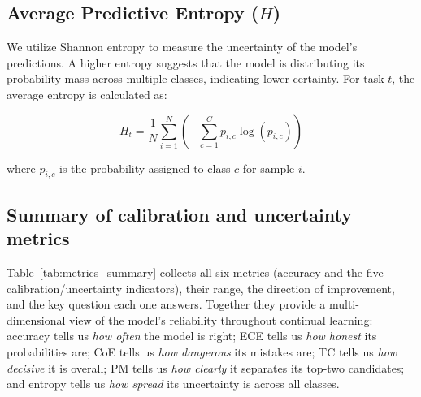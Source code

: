 \subsection{Average Predictive Entropy ($H$)}
We utilize Shannon entropy to measure the uncertainty of the model's predictions. A higher entropy suggests that the model is distributing its probability mass across multiple classes, indicating lower certainty. For task $t$, the average entropy is calculated as:

\begin{equation}
	H_t = \frac{1}{N} \sum_{i=1}^{N} \left( - \sum_{c=1}^{C} p_{i,c} \log(p_{i,c}) \right)
\end{equation}

where $p_{i,c}$ is the probability assigned to class $c$ for sample $i$.

\subsection*{Summary of calibration and uncertainty metrics}

Table~\ref{tab:metrics_summary} collects all six metrics (accuracy and the five calibration/uncertainty indicators), their range, the direction of improvement, and the key question each one answers. Together they provide a multi-dimensional view of the model's reliability throughout continual learning: accuracy tells us \emph{how often} the model is right; ECE tells us \emph{how honest} its probabilities are; CoE tells us \emph{how dangerous} its mistakes are; TC tells us \emph{how decisive} it is overall; PM tells us \emph{how clearly} it separates its top-two candidates; and entropy tells us \emph{how spread} its uncertainty is across all classes.

